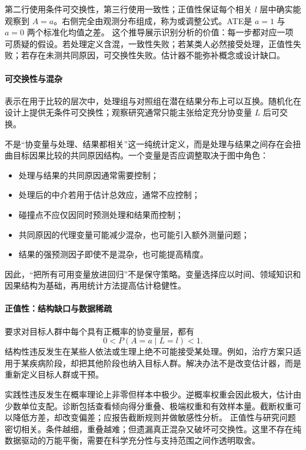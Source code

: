 第二行使用条件可交换性，第三行使用一致性；正值性保证每个相关 $l$ 层中确实能观察到 $A=a$。右侧完全由观测分布组成，称为或调整公式。ATE是 $a=1$ 与 $a=0$ 两个标准化均值之差。
这个推导展示识别分析的价值：每一步都对应一项可质疑的假设。若处理定义含混，一致性失败；若某类人必然接受处理，正值性失败；若存在未测共同原因，可交换性失败。估计器不能弥补概念或设计缺口。

\paragraph{可交换性与混杂}

表示在用于比较的层次中，处理组与对照组在潜在结果分布上可以互换。随机化在设计上提供无条件可交换性；观察研究通常只能主张给定充分协变量 $L$ 后可交换。

不是“协变量与处理、结果都相关”这一纯统计定义，而是处理与结果之间存在会扭曲目标因果比较的共同原因结构。一个变量是否应调整取决于图中角色：

\begin{itemize}
  \item 处理与结果的共同原因通常需要控制；
  \item 处理后的中介若用于估计总效应，通常不应控制；
  \item 碰撞点不应仅因同时预测处理和结果而控制；
  \item 共同原因的代理变量可能减少混杂，也可能引入额外测量问题；
  \item 结果的强预测因子即使不是混杂，也可能提高精度。
\end{itemize}

因此，“把所有可用变量放进回归”不是保守策略。变量选择应以时间、领域知识和因果结构为基础，再用统计方法提高估计稳健性。

\paragraph{正值性：结构缺口与数据稀疏}

要求对目标人群中每个具有正概率的协变量层，都有
\[
0<P(A=a\mid L=l)<1.
\]
结构性违反发生在某些人依法或生理上绝不可能接受某处理。例如，治疗方案只适用于某疾病阶段，却把其他阶段也纳入目标人群。解决办法不是改变估计器，而是重新定义目标人群或干预。

实践性违反发生在概率理论上非零但样本中极少。逆概率权重会因此极大，估计由少数单位支配。诊断包括查看倾向得分重叠、极端权重和有效样本量。截断权重可以降低方差，却改变偏差；应报告截断规则并做敏感性分析。
正值性与研究问题密切相关。条件越细，重叠越难；但遗漏真正混杂又破坏可交换性。这里不存在纯数据驱动的万能平衡，需要在科学充分性与支持范围之间作透明取舍。

